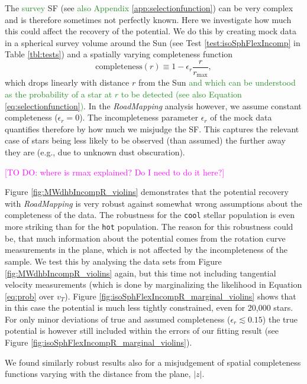 \documentclass[iop,revtex4]{emulateapj}
\newcommand{\RM}{{\sl RoadMapping}}
\newcommand{\NEW}[1]{\textcolor{ForestGreen}{#1}}
\newcommand{\Wilma}[1]{\textcolor{Magenta}{#1}}
\newcommand{\OLD}[1]{}
\begin{document}
The \NEW{survey} SF (see \OLD{Section}\NEW{also Appendix} \ref{app:selectionfunction}) can be very complex and is therefore sometimes not perfectly known. Here we investigate how much this could affect the recovery of the potential. We do this by creating mock data in a spherical survey volume around the Sun (see Test \ref{test:isoSphFlexIncomp} in Table \ref{tbl:tests}) and a spatially varying completeness function
\begin{equation}
\text{completeness}(r) \equiv 1- \epsilon_r \frac{r}{r_\text{max}}, \label{eq:rad_incomp}
\end{equation}
which drops linearly with distance $r$ from the Sun \NEW{and which can be understood as the probability of a star at $r$ to be detected (see also  Equation \ref{eq:selectionfunction})}. In the \RM{} analysis however, we assume constant completeness ($\epsilon_r=0$). The incompleteness parameter $\epsilon_r$ of the mock data quantifies therefore by how much we misjudge the SF. This captures the relevant case of stars being less likely to be observed (than assumed) the further away they are (e.g., due to unknown dust obscuration). 

\Wilma{[TO DO: where is rmax explained? Do I need to do it here?]}

Figure \ref{fig:MWdhbIncompR_violins} demonstrates that the potential recovery with \RM{} is very robust against somewhat wrong assumptions about the completeness of the data. The robustness for the \texttt{cool} stellar population is even more striking than for the \texttt{hot} population. The reason for this robustness could be, that much information about the potential comes from the rotation curve measurements in the plane, which is not affected by the incompleteness of the sample. We test this by analysing the data sets from Figure \ref{fig:MWdhbIncompR_violins} again, but this time not including tangential velocity measurements (which is done by marginalizing the likelihood in Equation \eqref{eq:prob} over $v_T$). Figure \ref{fig:isoSphFlexIncompR_marginal_violins} shows that in this case the potential is much less tightly constrained, even for 20,000 stars. For only minor deviations of true and assumed completeness ($\epsilon_r \lesssim 0.15$) the true potential is however still included within the errors of our fitting result (see Figure \ref{fig:isoSphFlexIncompR_marginal_violins}).

We found similarly robust results also for a misjudgement of spatial completeness functions varying with the distance from the plane, $|z|$.
\end{document}
